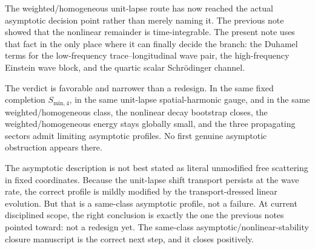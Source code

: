 \documentclass[11pt]{article}
\begin{document}
The weighted/homogeneous unit-lapse route has now reached the actual asymptotic decision point rather than merely naming it. The previous note showed that the nonlinear remainder is time-integrable. The present note uses that fact in the only place where it can finally decide the branch: the Duhamel terms for the low-frequency trace--longitudinal wave pair, the high-frequency Einstein wave block, and the quartic scalar Schr\"odinger channel.

The verdict is favorable and narrower than a redesign. In the same fixed completion \(S_{\mathrm{min},4}\), in the same unit-lapse spatial-harmonic gauge, and in the same weighted/homogeneous class, the nonlinear decay bootstrap closes, the weighted/homogeneous energy stays globally small, and the three propagating sectors admit limiting asymptotic profiles. No first genuine asymptotic obstruction appears there.

The asymptotic description is not best stated as literal unmodified free scattering in fixed coordinates. Because the unit-lapse shift transport persists at the wave rate, the correct profile is mildly modified by the transport-dressed linear evolution. But that is a same-class asymptotic profile, not a failure. At current disciplined scope, the right conclusion is exactly the one the previous notes pointed toward: not a redesign yet. The same-class asymptotic/nonlinear-stability closure manuscript is the correct next step, and it closes positively.
\end{document}
